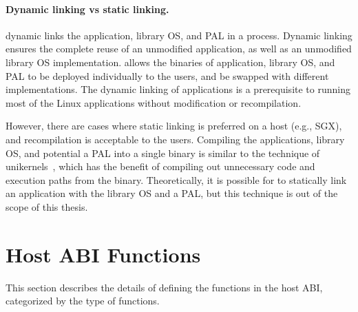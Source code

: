 \paragraph{Dynamic linking vs static linking.}
\graphene{} dynamic links the application, library OS, and PAL
in a process.
Dynamic linking ensures the complete reuse of an unmodified application,
as well as an unmodified library OS implementation.
\graphene{} allows the binaries of application, library OS, and PAL to be deployed individually to the users,
and be swapped with different implementations.
The dynamic linking of applications is a prerequisite
to running most of the Linux applications without modification or recompilation.



However, there are cases where static linking is preferred on a host (e.g., SGX), and recompilation is acceptable to the users.
Compiling the applications, library OS, and potential a PAL
into a single binary is similar to the technique of unikernels~\cite{unikernels},
which has the benefit of compiling out unnecessary code and execution paths
from the binary. 
Theoretically, it is possible for \graphene{} to statically link an application with the library OS and a PAL,
but this technique is out of the scope of this thesis.




\section{Host ABI Functions}


This section describes
the details of defining the functions in the host ABI,
categorized by the type of functions.

